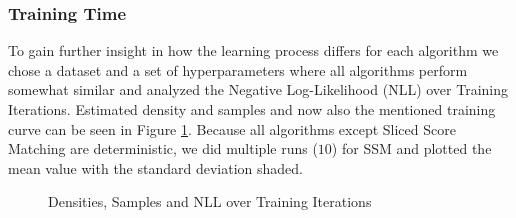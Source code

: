 \subsubsection{Training Time}

To gain further insight in how the learning process differs for each algorithm we chose a dataset and a set of hyperparameters
where all algorithms perform somewhat similar and analyzed the Negative Log-Likelihood (NLL) over Training Iterations. 
Estimated density and samples and now also the mentioned training curve can be seen in Figure \ref{fig:halfmoons_10_logp}. Because all algorithms except Sliced Score Matching are deterministic, we did multiple runs ($10$) for SSM and plotted the mean value 
with the standard deviation shaded. 

\begin{figure}[H]
    \centering
    \caption{Densities, Samples and NLL over Training Iterations}
    \label{fig:halfmoons_10_logp}
\end{figure}

